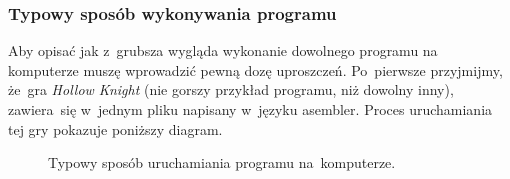 \documentclass[10pt,t]{beamer}
\begin{document}
\begin{frame}
  \frametitle{Typowy sposób wykonywania programu}


  Aby opisać jak z~grubsza wygląda wykonanie dowolnego programu na
  komputerze muszę wprowadzić pewną dozę uproszczeń. Po~pierwsze
  przyjmijmy, że~gra \textit{Hollow Knight} (nie gorszy przykład programu,
  niż dowolny inny), zawiera~się w~jednym pliku napisany w~języku asembler.
  Proces uruchamiania tej gry pokazuje poniższy diagram.





  \begin{figure}

    \label{fig:Running-Hollow-Knight-bad}


    \caption{Typowy sposób uruchamiania programu na~komputerze.}


  \end{figure}

\end{frame}
\end{document}
